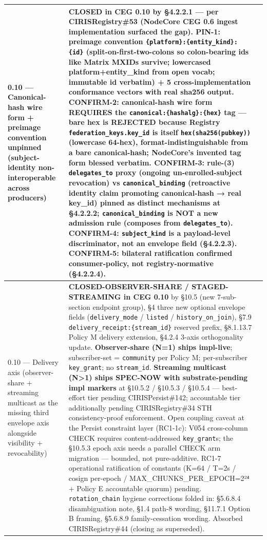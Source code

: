 \documentclass[11pt]{article}
\begin{document}
{\begin{longtable}{|p{5.33cm}|p{5.33cm}|p{5.33cm}|}
0.10 — Canonical-hash wire form + preimage convention unpinned (subject-identity non-interoperable across producers) & \textbf{CLOSED in CEG 0.10} by §4.2.2.1 — per CIRISRegistry\#53 (NodeCore CEG 0.6 ingest implementation surfaced the gap). \textbf{PIN-1}: preimage convention \texttt{\{platform\}:\{entity\_kind\}:\{id\}} (split-on-first-two-colons so colon-bearing ids like Matrix MXIDs survive; lowercased platform+entity\_kind from open vocab; immutable id verbatim) + 5 cross-implementation conformance vectors with real sha256 output. \textbf{CONFIRM-2}: canonical-hash wire form REQUIRES the \texttt{canonical:\{hashalg\}:\{hex\}} tag — bare hex is REJECTED because Registry \texttt{federation\_keys.key\_id} is itself \texttt{hex(sha256(pubkey))} (lowercase 64-hex), format-indistinguishable from a bare canonical-hash; NodeCore's invented tag form blessed verbatim. \textbf{CONFIRM-3}: rule-(3) \texttt{delegates\_to} proxy (ongoing un-enrolled-subject revocation) vs \texttt{canonical\_binding} (retroactive identity claim promoting canonical-hash → real key\_id) pinned as distinct mechanisms at §4.2.2.2; \texttt{canonical\_binding} is NOT a new admission rule (composes from \texttt{delegates\_to}). \textbf{CONFIRM-4}: \texttt{subject\_kind} is a payload-level discriminator, not an envelope field (§4.2.2.3). \textbf{CONFIRM-5}: bilateral ratification confirmed consumer-policy, not registry-normative (§4.2.2.4). &  \\ \hline
0.10 — Delivery axis (observer-share + streaming multicast as the missing third envelope axis alongside visibility + revocability) & \textbf{CLOSED-OBSERVER-SHARE / STAGED-STREAMING in CEG 0.10} by §10.5 (new 7-sub-section endpoint group), §4 three new optional envelope fields (\texttt{delivery\_mode} / \texttt{listed} / \texttt{history\_on\_join}), §7.9 \texttt{delivery\_receipt:\{stream\_id\}} reserved prefix, §8.1.13.7 Policy M delivery extension, §4.2.4 3-axis orthogonality update. \textbf{Observer-share (N=1) ships impl-live}; subscriber-set = \texttt{community} per Policy M; per-subscriber \texttt{key\_grant}; no \texttt{stream\_id}. \textbf{Streaming multicast (N>1) ships SPEC-NOW with substrate-pending impl markers} at §10.5.2 / §10.5.3 / §10.5.4 — best-effort tier pending CIRISPersist\#142; accountable tier additionally pending CIRISRegistry\#34 STH consistency-proof enforcement. Open coupling caveat at the Persist constraint layer (RC1-1c): V054 cross-column CHECK requires content-addressed \texttt{key\_grant}s; the §10.5.3 epoch axis needs a parallel CHECK arm migration — bounded, not pure-additive. RC1-7 operational ratification of constants (K=64 / T=2s / cosign per-epoch / MAX\_CHUNKS\_PER\_EPOCH=2²⁴ + Policy E accountable quorum) pending. \texttt{rotation\_chain} hygiene corrections folded in: §5.6.8.4 disambiguation note, §1.4 path-8 wording, §11.7.1 Option B framing, §5.6.8.9 family-cessation wording. Absorbed CIRISRegistry\#44 (closing as superseded). &  \\ \hline
\end{longtable}}
\end{document}

